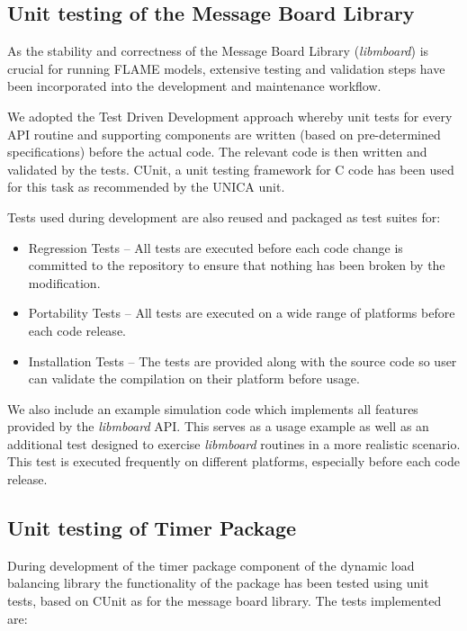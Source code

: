 \subsection{Unit testing of the Message Board Library}

As the stability and correctness of the Message Board Library (\textit{libmboard}) is crucial for running FLAME models, extensive testing and validation steps have been incorporated into the development and maintenance workflow. 

We adopted the Test Driven Development approach whereby unit tests for every API routine and supporting components are written (based on pre-determined specifications) before the actual code. The relevant code is then written and validated by the tests. CUnit, a unit testing framework for C code has been used for this task as recommended by the UNICA unit.

Tests used during development are also reused and packaged as test suites for:
\begin{itemize}
\item Regression Tests -- All tests are executed before each code change is committed to the repository to ensure that nothing has been broken by the modification.
\item Portability Tests -- All tests are executed on a wide range of platforms before each code release.
\item Installation Tests -- The tests are provided along with the source code so user can validate the compilation on their platform before usage.
\end{itemize}

We also include an example simulation code which implements all features provided by the \textit{libmboard} API. This serves as a usage example as well as an additional test designed to exercise \textit{libmboard} routines in a more realistic scenario. This test is executed frequently on different platforms, especially before each code release.

\subsection{Unit testing of Timer Package}

During development of the timer package component of the dynamic load balancing library the functionality of the package has been tested using unit tests, based on CUnit as for the message board library.  The tests implemented are:

